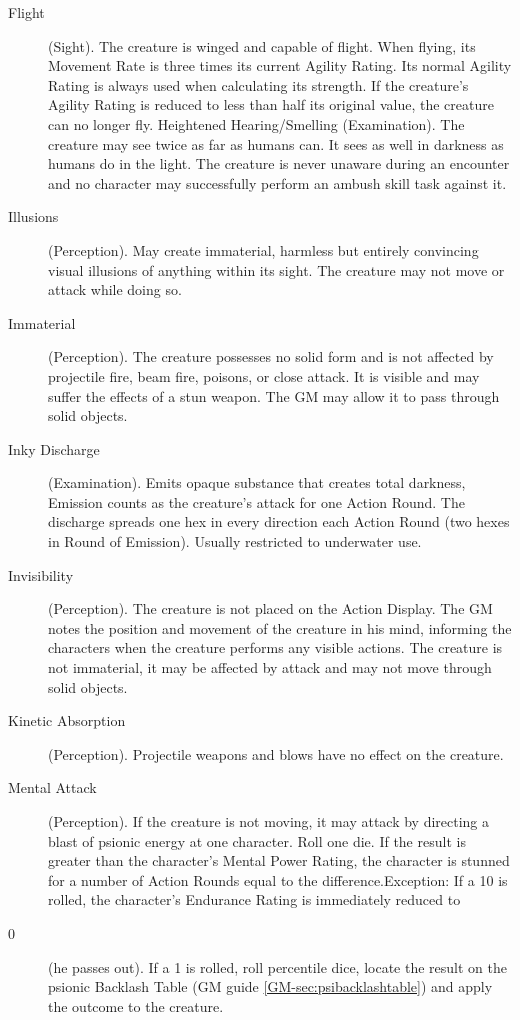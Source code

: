 \begin{description}
\item[Flight] (Sight). The creature is winged and capable of flight.
  When flying, its Movement Rate is three times its current Agility
  Rating. Its normal Agility Rating is always used when calculating its
  strength. If the creature's Agility Rating is reduced to less than
  half its original value, the creature can no longer fly.  Heightened
  Hearing/Smelling (Examination). The creature may see twice as far as
  humans can. It sees as well in darkness as humans do in the light. The
  creature is never unaware during an encounter and no character may
  successfully perform an ambush skill task against it.

\item[Illusions] (Perception). May create immaterial, harmless but
  entirely convincing visual illusions of anything within its sight. The
  creature may not move or attack while doing so.

\item[Immaterial] (Perception). The creature possesses no solid form
  and is not affected by projectile fire, beam fire, poisons, or close
  attack.  It is visible and may suffer the effects of a stun weapon.
  The GM may allow it to pass through solid objects.

\item[Inky Discharge] (Examination). Emits opaque substance that
  creates total darkness, Emission counts as the creature's attack for
  one Action Round. The discharge spreads one hex in every direction
  each Action Round (two hexes in Round of Emission). Usually restricted
  to underwater use.

\item[Invisibility] (Perception). The creature is not placed on the
  Action Display. The GM notes the position and movement of the creature
  in his mind, informing the characters when the creature performs any
  visible actions. The creature is not immaterial, it may be affected by
  attack and may not move through solid objects.

\item[Kinetic Absorption] (Perception). Projectile weapons and blows
  have no effect on the creature.

\item[Mental Attack] (Perception). If the creature is not moving, it
  may attack by directing a blast of psionic energy at one character.
  Roll one die. If the result is greater than the character's Mental
  Power Rating, the character is stunned for a number of Action Rounds
  equal to the difference.Exception: If a 10 is rolled, the character's
  Endurance Rating is immediately reduced to \item[0] (he passes out).
  If a 1 is rolled, roll percentile dice, locate the result on the
  psionic Backlash Table (GM guide \ref{GM-sec:psibacklashtable}) and
  apply the outcome to the creature.


\end{description}
